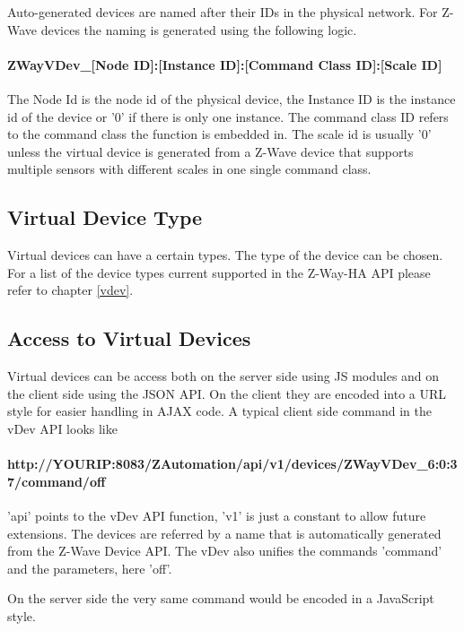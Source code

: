 Auto-generated devices are named after their IDs in the physical network. For Z-Wave 
devices the naming is generated using the following logic.

\paragraph{ZWayVDev\_[Node ID]:[Instance ID]:[Command Class ID]:[Scale ID]}

The Node Id is the node id of the physical device, the Instance ID is the instance id 
of the device  or '0' if there is only one instance. The command class ID refers to the 
command class the function is embedded in. The scale id is usually '0' unless the virtual
device is generated from a Z-Wave device that supports multiple sensors with different 
scales in one single command class.

\subsection{Virtual Device Type}

Virtual devices can have a certain types. The type of the device can be chosen. For a list 
of the device types current supported in the Z-Way-HA API please refer to chapter
\ref{vdev}.
 
\subsection{Access to Virtual Devices}

Virtual devices can be access both on the server side using JS modules and on the client 
side using the JSON API. On the client they are encoded into a URL style for easier 
handling  in AJAX code. A typical client side command in the vDev API looks like

\paragraph{http://YOURIP:8083/ZAutomation/api/v1/devices/ZWayVDev\_6:0:37/command/off}

'api' points to the vDev API function, 'v1' is just a constant to allow future extensions. 
The devices are referred by a name that is automatically generated from the Z-Wave 
Device API. The vDev also unifies the commands 'command' and the parameters, here 'off'.

On the server side the very same command would be encoded in a JavaScript style.

